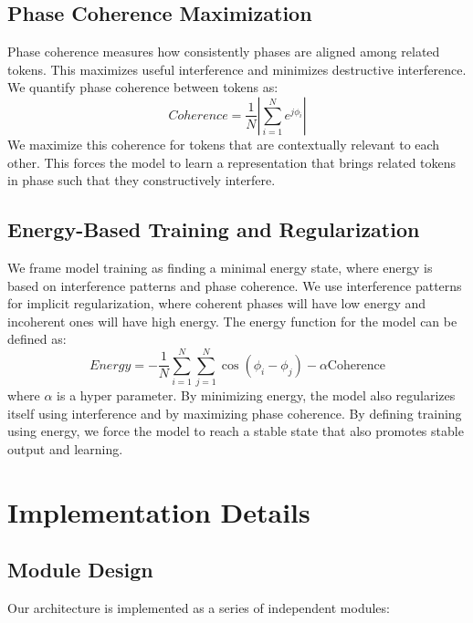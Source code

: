 \documentclass[11pt, a4paper]{article}
\begin{document}
\subsection{Phase Coherence Maximization}

Phase coherence measures how consistently phases are aligned among related tokens. This maximizes useful interference and minimizes destructive interference. We quantify phase coherence between tokens as:
$$
Coherence = \frac{1}{N} |\sum_{i=1}^{N} e^{j \phi_i} |
$$
We maximize this coherence for tokens that are contextually relevant to each other. This forces the model to learn a representation that brings related tokens in phase such that they constructively interfere.

\subsection{Energy-Based Training and Regularization}

We frame model training as finding a minimal energy state, where energy is based on interference patterns and phase coherence. We use interference patterns for implicit regularization, where coherent phases will have low energy and incoherent ones will have high energy. The energy function for the model can be defined as:
$$
Energy = -\frac{1}{N} \sum_{i=1}^{N} \sum_{j=1}^{N} \cos(\phi_i - \phi_j) - \alpha \text{Coherence}
$$
where $\alpha$ is a hyper parameter. By minimizing energy, the model also regularizes itself using interference and by maximizing phase coherence. By defining training using energy, we force the model to reach a stable state that also promotes stable output and learning.

\section{Implementation Details}

\subsection{Module Design}
Our architecture is implemented as a series of independent modules:
\end{document}
